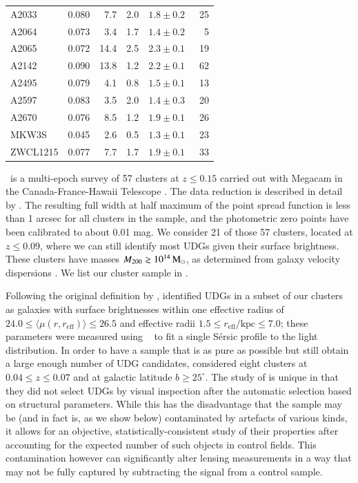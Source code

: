 \documentclass[usenatbib,fleqn]{mnras}
\def\reff{r_\mathrm{eff}}
\begin{document}
\begin{table}
\begin{tabular}{l c r@{ $\pm$ }l c c}
A2033      & 0.080 &  7.7 & 2.0 & $1.8\pm0.2$ &      \,\,\,25 \\
A2064      & 0.073 &  3.4 & 1.7 & $1.4\pm0.2$ & \,\,\,\,\,\,5 \\
A2065      & 0.072 & 14.4 & 2.5 & $2.3\pm0.1$ &      \,\,\,19 \\
A2142      & 0.090 & 13.8 & 1.2 & $2.2\pm0.1$ &      \,\,\,62 \\
A2495      & 0.079 &  4.1 & 0.8 & $1.5\pm0.1$ &      \,\,\,13 \\
A2597      & 0.083 &  3.5 & 2.0 & $1.4\pm0.3$ &      \,\,\,20 \\
A2670      & 0.076 &  8.5 & 1.2 & $1.9\pm0.1$ &      \,\,\,26 \\
MKW3S      & 0.045 &  2.6 & 0.5 & $1.3\pm0.1$ &      \,\,\,23 \\
ZWCL1215   & 0.077 &  7.7 & 1.7 & $1.9\pm0.1$ &      \,\,\,33 \\
[0.5ex]
\hline
\end{tabular}
\end{table}

\meneacs\ is a multi-epoch survey of 57 clusters at $z\leq0.15$ carried out with Megacam in the Canada-France-Hawaii Telescope \citep{sand12}. The data reduction is described in detail by \cite{vdburg13,vdburg16}. The resulting full width at half maximum of the point spread function is less than 1 arcsec for all clusters in the sample, and the photometric zero points have been calibrated to about 0.01 mag.
%
We consider 21 of those 57 clusters, located at $z\leq0.09$, where we can still identify most UDGs given their surface brightness. These clusters have masses $M_{200}\gtrsim10^{14}\,\mathrm{M}_\odot$, as determined from galaxy velocity dispersions \citep{sifon15_cccp}. We list our cluster sample in .

Following the original definition by \cite{vandokkum15_coma}, \cite{vdburg16} identified UDGs in a subset of our clusters as galaxies with surface brightnesses within one effective radius of $24.0\leq \langle\mu(r,\reff)\rangle\leq26.5$ and effective radii $1.5\leq\reff/\mathrm{kpc}\leq7.0$; these parameters were measured using \galfit\ \citep{peng02,peng10} to fit a single S\'ersic profile to the light distribution. In order to have a sample that is as pure as possible but still obtain a large enough number of UDG candidates, \cite{vdburg16} considered eight clusters at $0.04\leq z \leq0.07$ and at galactic latitude $b\geq25^\circ$. The study of \cite{vdburg16} is unique in that they did not select UDGs by visual inspection after the automatic selection based on structural parameters. While this has the disadvantage that the sample may be (and in fact is, as we show below) contaminated by artefacts of various kinds, it allows for an objective, statistically-consistent study of their properties after accounting for the expected number of such objects in control fields. This contamination however can significantly alter lensing measurements in a way that may not be fully captured by subtracting the signal from a control sample.
\end{document}
